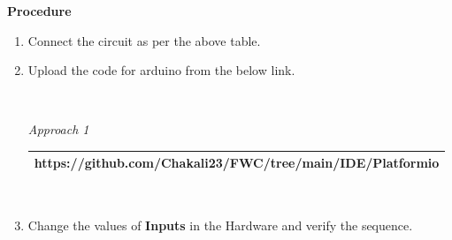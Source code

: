 \documentclass[journal,12pt,twocolumn]{IEEEtran}
\begin{document}
\textbf{Procedure}
\begin{enumerate}[label={\arabic*}.]
	\item Connect the circuit as per the above table.
	\item Upload the code for arduino from the below link.
		\vspace{\baselineskip}
                \begin{tabularx}{0.45\textwidth}{
				| >{\centering\arraybackslash}X|}
		\end{tabularx}
		\vspace{\baselineskip}\\
		\textit{Approach 1}
		\begin{tabularx}{0.45\textwidth}{| >{\centering\arraybackslash}X|}
			\hline
https://github.com/Chakali23/FWC/tree/main/IDE/Platformio\\
			\hline
		\end{tabularx}\\
		\vspace{\baselineskip}
	\item Change the values of \textbf{Inputs} in the Hardware and verify the sequence.
\end{enumerate}
\end{document}
